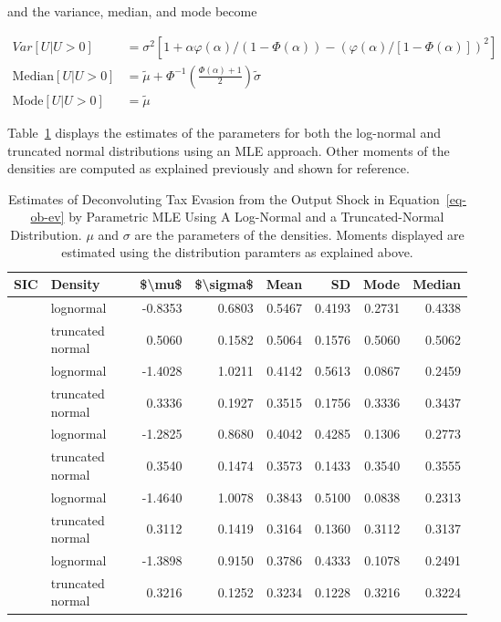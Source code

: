 \documentclass[
  12pt]{article}
\theoremstyle{definition}
\theoremstyle{remark}
\begin{document}
and the variance, median, and mode become

\[
\begin{aligned}  
Var[U|U>0]&=\sigma^2[1+\alpha\varphi(\alpha)/(1-\Phi(\alpha))-(\varphi(\alpha)/[1-\Phi(\alpha)])^2]\\
\text{Median}[U|U>0]&=\tilde\mu+\Phi^{-1}\left(\frac{\Phi(\alpha)+1}{2}\right)\tilde\sigma \\ 
\text{Mode}[U|U>0]&=\tilde\mu
\end{aligned}
\]

Table~\ref{tbl-deconv-mle-both} displays the estimates of the parameters
for both the log-normal and truncated normal distributions using an MLE
approach. Other moments of the densities are computed as explained
previously and shown for reference.

\begin{longtable}[t]{llrrrrrr}

\caption{\label{tbl-deconv-mle-both}Estimates of Deconvoluting Tax
Evasion from the Output Shock in Equation~\ref{eq-ob-ev} by Parametric
MLE Using A Log-Normal and a Truncated-Normal Distribution. \(\mu\) and
\(\sigma\) are the parameters of the densities. Moments displayed are
estimated using the distribution paramters as explained above.}

\tabularnewline

\toprule
SIC & Density & \$\textbackslash{}mu\$ & \$\textbackslash{}sigma\$ & Mean & SD & Mode & Median\\
\midrule
 & lognormal & -0.8353 & 0.6803 & 0.5467 & 0.4193 & 0.2731 & 0.4338\\
\cmidrule{2-8}\nopagebreak
\multirow[t]{-2}{*}{\raggedright\arraybackslash 351} & truncated normal & 0.5060 & 0.1582 & 0.5064 & 0.1576 & 0.5060 & 0.5062\\
\cmidrule{1-8}\pagebreak[0]
 & lognormal & -1.4028 & 1.0211 & 0.4142 & 0.5613 & 0.0867 & 0.2459\\
\cmidrule{2-8}\nopagebreak
\multirow[t]{-2}{*}{\raggedright\arraybackslash 313} & truncated normal & 0.3336 & 0.1927 & 0.3515 & 0.1756 & 0.3336 & 0.3437\\
\cmidrule{1-8}\pagebreak[0]
 & lognormal & -1.2825 & 0.8680 & 0.4042 & 0.4285 & 0.1306 & 0.2773\\
\cmidrule{2-8}\nopagebreak
\multirow[t]{-2}{*}{\raggedright\arraybackslash 321} & truncated normal & 0.3540 & 0.1474 & 0.3573 & 0.1433 & 0.3540 & 0.3555\\
\cmidrule{1-8}\pagebreak[0]
 & lognormal & -1.4640 & 1.0078 & 0.3843 & 0.5100 & 0.0838 & 0.2313\\
\cmidrule{2-8}\nopagebreak
\multirow[t]{-2}{*}{\raggedright\arraybackslash 352} & truncated normal & 0.3112 & 0.1419 & 0.3164 & 0.1360 & 0.3112 & 0.3137\\
\cmidrule{1-8}\pagebreak[0]
 & lognormal & -1.3898 & 0.9150 & 0.3786 & 0.4333 & 0.1078 & 0.2491\\
\cmidrule{2-8}\nopagebreak
\multirow[t]{-2}{*}{\raggedright\arraybackslash 311} & truncated normal & 0.3216 & 0.1252 & 0.3234 & 0.1228 & 0.3216 & 0.3224\\
\bottomrule

\end{longtable}
\end{document}
